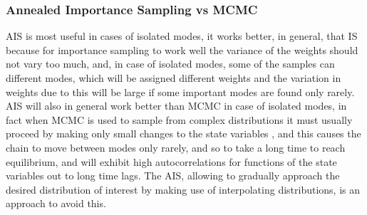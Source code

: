 \documentclass[12pt,mythesisstyle]{report}
\begin{document}
\subsubsection{Annealed Importance Sampling vs MCMC}
AIS is most useful in cases of isolated modes, it works better, in general, that IS because for importance sampling to work well the variance of the weights should not vary too much, and, in case of isolated modes, some of the samples can different modes, which will be assigned different weights and the variation in weights due to this will be large if some important modes are found only rarely. AIS will also in general work better than MCMC in case of isolated modes, in fact when MCMC is used to sample from complex distributions it must usually proceed by making only small changes to the state variables \cite{annealedis}, and this causes the chain to move between modes only rarely, and so to take a long time to reach equilibrium, and will exhibit high autocorrelations for functions of the state variables out to long time lags. The AIS, allowing to gradually approach the desired distribution of interest by making use of interpolating distributions, is an approach to avoid this.
\end{document}
